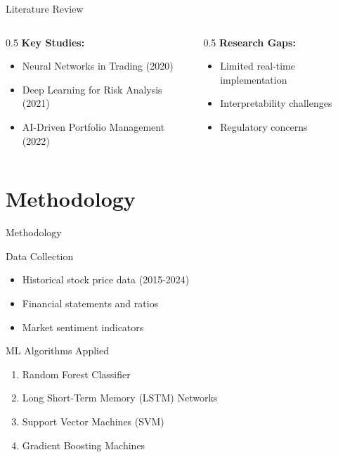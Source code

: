 \documentclass[aspectratio=169]{beamer}
\begin{document}
\begin{frame}{Literature Review}
  \begin{columns}[T]
    \begin{column}{0.5\textwidth}
      \textbf{Key Studies:}
      \begin{itemize}
        \item Neural Networks in Trading (2020)
        \item Deep Learning for Risk Analysis (2021)
        \item AI-Driven Portfolio Management (2022)
      \end{itemize}
    \end{column}
    
    \begin{column}{0.5\textwidth}
      \textbf{Research Gaps:}
      \begin{itemize}
        \item Limited real-time implementation
        \item Interpretability challenges
        \item Regulatory concerns
      \end{itemize}
    \end{column}
  \end{columns}
\end{frame}

\section{Methodology}

\begin{frame}{Methodology}
  \begin{block}{Data Collection}
    \begin{itemize}
      \item Historical stock price data (2015-2024)
      \item Financial statements and ratios
      \item Market sentiment indicators
    \end{itemize}
  \end{block}
  
  \begin{block}{ML Algorithms Applied}
    \begin{enumerate}
      \item Random Forest Classifier
      \item Long Short-Term Memory (LSTM) Networks
      \item Support Vector Machines (SVM)
      \item Gradient Boosting Machines
    \end{enumerate}
  \end{block}
\end{frame}
\end{document}
